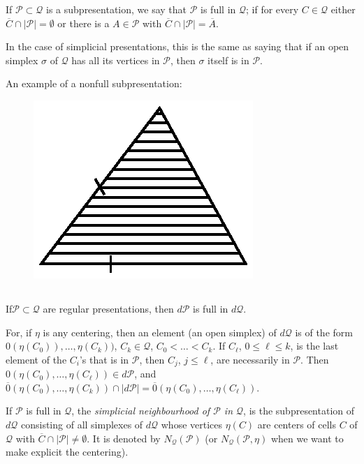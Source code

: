 If $\mathscr{P}\subset \mathcal{Q}$ is a subpresentation, we say that $\mathscr{P}$ is full in $\mathcal{Q}$; if for every $C\in\mathcal{Q}$ either $\overline{C}\cap |\mathscr{P}|=\emptyset$ or there is a $A\in \mathscr{P}$ with $\overline{C}\cap |\mathscr{P}|=\overline{A}$.

In the case of simplicial presentations, this is the same as saying that if an open simplex $\sigma$ of $\mathcal{Q}$ has all its vertices in $\mathscr{P}$, then $\sigma$ itself is in $\mathscr{P}$.

An example of a nonfull subpresentation:
\begin{figure}[H]
\centering
\includegraphics{figure/fig8.eps}
\end{figure}

\subsection{}\label{chap3-sec3.1.1}
If\pageoriginale $\mathscr{P}\subset \mathcal{Q}$ are regular presentations, then $d\mathscr{P}$ is full in $d\mathcal{Q}$.

For, if $\eta$ is any centering, then an element (an open simplex) of $d\mathcal{Q}$ is of the form $0(\eta(C_{0})),\ldots,\eta(C_{k}))$, $C_{k}\in\mathcal{Q}$, $C_{0}<\ldots<C_{k}$. If $C_{\ell}$, $0\leq \ell\leq k$, is the last element of the $C_{i}$'s that is in $\mathscr{P}$, then $C_{j}$, $j\leq \ell$, are necessarily in $\mathscr{P}$. Then $0(\eta(C_{0}),\ldots,\eta(C_{\ell}))\in d\mathscr{P}$, and $\overline{0}(\eta(C_{0}),\ldots,\eta(C_{k}))\cap |d\mathscr{P}|=\overline{0}(\eta(C_{0}),\ldots,\eta(C_{\ell}))$.

\setcounter{proposition}{1}
\begin{definition}\label{chap3-defi3.1.2}
If $\mathscr{P}$ is full in $\mathcal{Q}$, the {\em simplicial neighbourhood of $\mathscr{P}$ in $\mathcal{Q}$}, is the subpresentation of $d\mathcal{Q}$ consisting of all simplexes of $d\mathcal{Q}$ whose vertices $\eta(C)$ are centers of cells $C$ of $\mathcal{Q}$ with $\overline{C}\cap |\mathscr{P}|\neq \emptyset$. It is denoted by $N_{\mathcal{Q}}(\mathscr{P})$ (or $N_{\mathcal{Q}}(\mathscr{P},\eta)$ when we want to make explicit the centering).
\end{definition}

